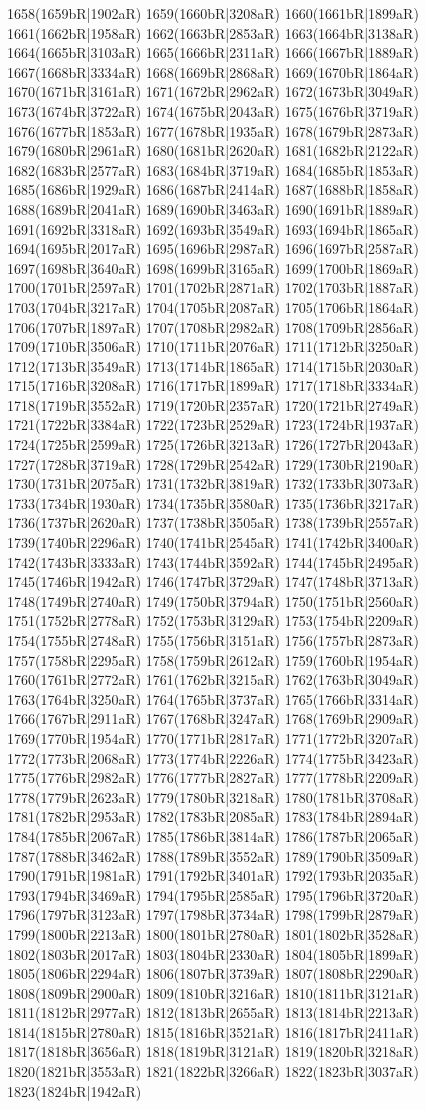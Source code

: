 1658(1659bR|1902aR) 1659(1660bR|3208aR) 1660(1661bR|1899aR) 1661(1662bR|1958aR) 1662(1663bR|2853aR) 1663(1664bR|3138aR) 1664(1665bR|3103aR) 1665(1666bR|2311aR) 1666(1667bR|1889aR) 1667(1668bR|3334aR) 1668(1669bR|2868aR) 1669(1670bR|1864aR) 1670(1671bR|3161aR) 1671(1672bR|2962aR) 1672(1673bR|3049aR) 1673(1674bR|3722aR) 1674(1675bR|2043aR) 1675(1676bR|3719aR) 1676(1677bR|1853aR) 1677(1678bR|1935aR) 1678(1679bR|2873aR) 1679(1680bR|2961aR) 1680(1681bR|2620aR) 1681(1682bR|2122aR) 1682(1683bR|2577aR) 1683(1684bR|3719aR) 1684(1685bR|1853aR) 1685(1686bR|1929aR) 1686(1687bR|2414aR) 1687(1688bR|1858aR) 1688(1689bR|2041aR) 1689(1690bR|3463aR) 1690(1691bR|1889aR) 1691(1692bR|3318aR) 1692(1693bR|3549aR) 1693(1694bR|1865aR) 1694(1695bR|2017aR) 1695(1696bR|2987aR) 1696(1697bR|2587aR) 1697(1698bR|3640aR) 1698(1699bR|3165aR) 1699(1700bR|1869aR) 1700(1701bR|2597aR) 1701(1702bR|2871aR) 1702(1703bR|1887aR) 1703(1704bR|3217aR) 1704(1705bR|2087aR) 1705(1706bR|1864aR) 1706(1707bR|1897aR) 1707(1708bR|2982aR) 1708(1709bR|2856aR) 1709(1710bR|3506aR) 1710(1711bR|2076aR) 1711(1712bR|3250aR) 1712(1713bR|3549aR) 1713(1714bR|1865aR) 1714(1715bR|2030aR) 1715(1716bR|3208aR) 1716(1717bR|1899aR) 1717(1718bR|3334aR) 1718(1719bR|3552aR) 1719(1720bR|2357aR) 1720(1721bR|2749aR) 1721(1722bR|3384aR) 1722(1723bR|2529aR) 1723(1724bR|1937aR) 1724(1725bR|2599aR) 1725(1726bR|3213aR) 1726(1727bR|2043aR) 1727(1728bR|3719aR) 1728(1729bR|2542aR) 1729(1730bR|2190aR) 1730(1731bR|2075aR) 1731(1732bR|3819aR) 1732(1733bR|3073aR) 1733(1734bR|1930aR) 1734(1735bR|3580aR) 1735(1736bR|3217aR) 1736(1737bR|2620aR) 1737(1738bR|3505aR) 1738(1739bR|2557aR) 1739(1740bR|2296aR) 1740(1741bR|2545aR) 1741(1742bR|3400aR) 1742(1743bR|3333aR) 1743(1744bR|3592aR) 1744(1745bR|2495aR) 1745(1746bR|1942aR) 1746(1747bR|3729aR) 1747(1748bR|3713aR) 1748(1749bR|2740aR) 1749(1750bR|3794aR) 1750(1751bR|2560aR) 1751(1752bR|2778aR) 1752(1753bR|3129aR) 1753(1754bR|2209aR) 1754(1755bR|2748aR) 1755(1756bR|3151aR) 1756(1757bR|2873aR) 1757(1758bR|2295aR) 1758(1759bR|2612aR) 1759(1760bR|1954aR) 1760(1761bR|2772aR) 1761(1762bR|3215aR) 1762(1763bR|3049aR) 1763(1764bR|3250aR) 1764(1765bR|3737aR) 1765(1766bR|3314aR) 1766(1767bR|2911aR) 1767(1768bR|3247aR) 1768(1769bR|2909aR) 1769(1770bR|1954aR) 1770(1771bR|2817aR) 1771(1772bR|3207aR) 1772(1773bR|2068aR) 1773(1774bR|2226aR) 1774(1775bR|3423aR) 1775(1776bR|2982aR) 1776(1777bR|2827aR) 1777(1778bR|2209aR) 1778(1779bR|2623aR) 1779(1780bR|3218aR) 1780(1781bR|3708aR) 1781(1782bR|2953aR) 1782(1783bR|2085aR) 1783(1784bR|2894aR) 1784(1785bR|2067aR) 1785(1786bR|3814aR) 1786(1787bR|2065aR) 1787(1788bR|3462aR) 1788(1789bR|3552aR) 1789(1790bR|3509aR) 1790(1791bR|1981aR) 1791(1792bR|3401aR) 1792(1793bR|2035aR) 1793(1794bR|3469aR) 1794(1795bR|2585aR) 1795(1796bR|3720aR) 1796(1797bR|3123aR) 1797(1798bR|3734aR) 1798(1799bR|2879aR) 1799(1800bR|2213aR) 1800(1801bR|2780aR) 1801(1802bR|3528aR) 1802(1803bR|2017aR) 1803(1804bR|2330aR) 1804(1805bR|1899aR) 1805(1806bR|2294aR) 1806(1807bR|3739aR) 1807(1808bR|2290aR) 1808(1809bR|2900aR) 1809(1810bR|3216aR) 1810(1811bR|3121aR) 1811(1812bR|2977aR) 1812(1813bR|2655aR) 1813(1814bR|2213aR) 1814(1815bR|2780aR) 1815(1816bR|3521aR) 1816(1817bR|2411aR) 1817(1818bR|3656aR) 1818(1819bR|3121aR) 1819(1820bR|3218aR) 1820(1821bR|3553aR) 1821(1822bR|3266aR) 1822(1823bR|3037aR) 1823(1824bR|1942aR) 